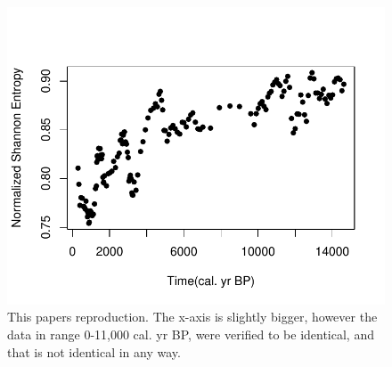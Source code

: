 \begin{figure}
    \centering
    \includegraphics[width=\textwidth,keepaspectratio]{ElNino/Entropy.pdf}
    \caption{This papers reproduction. The x-axis is slightly bigger, however the data in range 0-11,000 cal. yr BP, were verified to be identical, and that is not identical in any way.}
\end{figure}